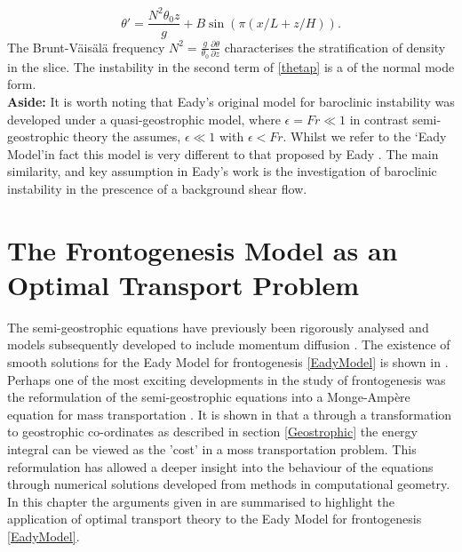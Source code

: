 \begin{equation}
	\theta' = \frac{N^2\theta_0 z}{g} + B\sin\left(\pi\left(x/L + z/H\right)\right).
\label{thetap}
\end{equation}
The Brunt-V\"{a}is\"{a}l\"{a} frequency $N^2 = \frac{g}{\theta_0}\frac{\partial \theta}{\partial z}$ characterises the stratification of density in the slice. The instability in the second term of \ref{thetap} is a of the normal mode form.
\\
\linebreak
\textbf{Aside:}
It is worth noting that Eady's original model for baroclinic instability was developed under a quasi-geostrophic model, where $\epsilon = Fr \ll 1$ in contrast semi-geostrophic theory the assumes, $\epsilon \ll 1$ with $\epsilon < Fr$. Whilst we refer to the \textquoteleft Eady Model\textquoteright in fact this model is very different to that proposed by Eady \cite{Eady}. The main similarity, and key assumption in Eady's work is the investigation of baroclinic instability in the prescence of a background shear flow.
\chapter{The Frontogenesis Model as an Optimal Transport Problem \label{Chapter3}}
The semi-geostrophic equations have previously been rigorously analysed \cite{Hoskins1975,Bannon1988,Cullen1993} and models subsequently developed to include momentum diffusion \cite{Blumen1990, Nakamura1994}. The existence of smooth solutions for the Eady Model for frontogenesis \ref{EadyModel} is shown in \cite{Brenier2009}. Perhaps one of the most exciting developments in the study of frontogenesis was the reformulation of the semi-geostrophic equations into a Monge-Amp\`{e}re equation for mass transportation \cite{Benamou1998} . It is shown in \cite{Cullen2006a} that a through a transformation to geostrophic co-ordinates as described in section \ref{Geostrophic} the energy integral can be viewed as the 'cost' in a moss transportation problem. This reformulation has allowed a deeper insight into the behaviour of the equations through numerical solutions developed from methods in computational geometry. In this chapter the arguments given in \cite{Cullen2006a} are summarised to highlight the application of optimal transport theory to the Eady Model for frontogenesis \ref{EadyModel}.
